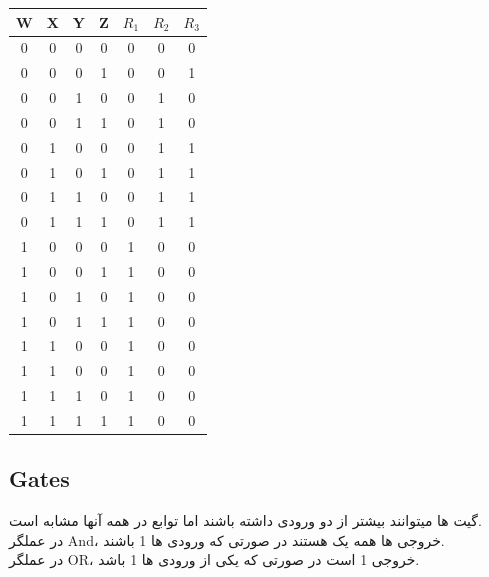 \documentclass[20pt, a5paper]{article}
\begin{document}
\begin{LTR}
	\begin{tabular}{ c c c c | c | c | c}
		W & X & Y & Z & $R_{1}$ & $R_{2}$ & $R_{3}$ \\
		\hline
		0 & 0 & 0 & 0 & 0 & 0 & 0\\
		0 & 0 & 0 & 1 & 0 & 0 & 1\\
		0 & 0 & 1 & 0 & 0 & 1 & 0\\
		0 & 0 & 1 & 1 & 0 & 1 & 0\\
		0 & 1 & 0 & 0 & 0 & 1 & 1\\
		0 & 1 & 0 & 1 & 0 & 1 & 1\\
		0 & 1 & 1 & 0 & 0 & 1 & 1\\
		0 & 1 & 1 & 1 & 0 & 1 & 1\\
		1 & 0 & 0 & 0 & 1 & 0 & 0\\
		1 & 0 & 0 & 1 & 1 & 0 & 0\\
		1 & 0 & 1 & 0 & 1 & 0 & 0\\
		1 & 0 & 1 & 1 & 1 & 0 & 0\\
		1 & 1 & 0 & 0 & 1 & 0 & 0\\
		1 & 1 & 0 & 0 & 1 & 0 & 0\\
		1 & 1 & 1 & 0 & 1 & 0 & 0\\
		1 & 1 & 1 & 1 & 1 & 0 & 0
	\end{tabular}
\end{LTR}



\subsection{Gates}
گیت ها میتوانند بیشتر از دو ورودی داشته باشند اما توابع در همه آنها مشابه است.\\
در عملگر And، خروجی ها همه یک هستند در صورتی که ورودی ها 1 باشند.\\
 در عملگر OR، خروجی 1 است در صورتی که یکی از ورودی ها 1 باشد.\\
\end{document}
